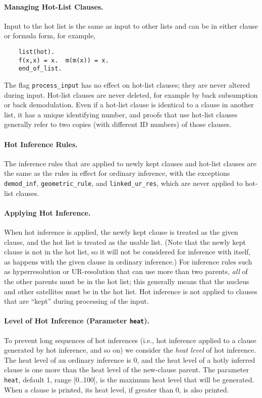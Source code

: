 \documentclass[11pt]{article}
\begin{document}
\paragraph{Managing Hot-List Clauses.}
Input to the hot list
is the same as input to other lists and can be in either clause
or formula form, for example,

{\small
\begin{verbatim}
    list(hot).
    f(x,x) = x.  m(m(x)) = x.
    end_of_list.
\end{verbatim}
}
\noindent
The flag \verb:process_input: has no effect on hot-list clauses;
they are never altered during input.  Hot-list clauses are never
deleted, for example by back subsumption or back demodulation.
Even if a hot-list clause is identical to a clause in another
list, it has a unique identifying number, and proofs that use
hot-list clauses generally refer to two copies (with different
ID numbers) of those clauses.

\paragraph{Hot Inference Rules.}
The inference rules that are
applied to newly kept clauses and hot-list clauses are
the same as the rules in effect for ordinary inference, with
the exceptions \verb:demod_inf:, \verb:geometric_rule:, and
\verb:linked_ur_res:, which are never applied to hot-list clauses.

\paragraph{Applying Hot Inference.}
When hot inference is applied,
the newly kept clause is treated as the given clause, and
the hot list is treated as the usable list.  (Note that the
newly kept clause is not in the hot list, so it will not be
considered for inference with itself, as happens with the
given clause in ordinary inference.)  For inference rules such as
hyperresolution or UR-resolution that can use more than two
parents, {\em all} of the other parents must be in the hot list;
this generally means that the nucleus and other satellites
must be in the hot list.  Hot inference is not applied to 
clauses that are ``kept'' during processing of the input.

\paragraph{Level of Hot Inference (Parameter {\tt heat}).}
To prevent long sequences of hot inferences (i.e., hot
inference applied to a clause generated by hot inference, and so on)
we consider the {\em heat level} of hot inference.  The heat level of
an ordinary inference is 0, and the heat level of a hotly inferred
clause is one more than the heat level of the new-clause parent.  The
parameter \verb:heat:, default 1, range [0..100], is the maximum heat
level that will be generated.  When a clause is printed, its heat
level, if greater than 0, is also printed.
\end{document}
